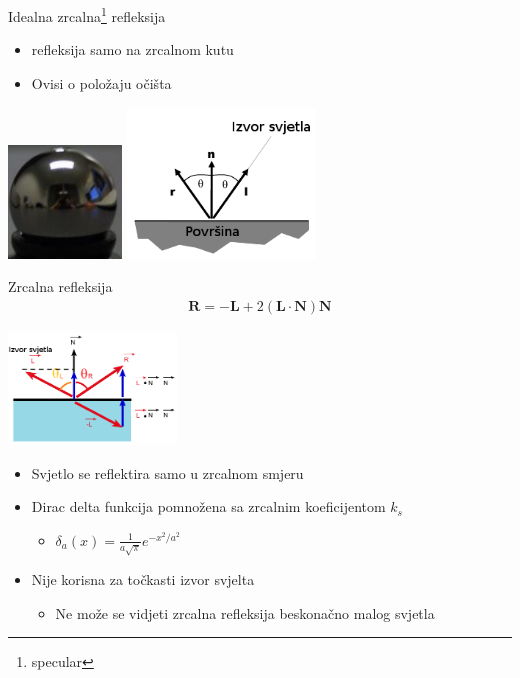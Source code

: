 \documentclass[9pt]{beamer}
\begin{document}
\begin{frame}{Idealna zrcalna\footnote[frame]{specular} refleksija}
	\begin{itemize}
		\item refleksija samo na zrcalnom kutu
		\item Ovisi o položaju očišta	
	\end{itemize}
	\begin{center}
		\includegraphics[height=3cm]{slike/specular_ball.png}
		\includegraphics[height=4cm]{slike/specular_refl.png}
	\end{center}
\end{frame}

\begin{frame}{Zrcalna refleksija}
	\begin{align*}
	\mathbf{R} = -\mathbf{L} + 2 (\mathbf{L}\cdot \mathbf{N})\mathbf{N}
	\end{align*}
	\begin{center}
		\includegraphics[height=3cm]{slike/mirror_refl.png}
	\end{center}
	\begin{itemize} %
		\item Svjetlo se reflektira \alert{samo} u zrcalnom smjeru
		\item Dirac delta funkcija pomnožena sa zrcalnim koeficijentom $k_s$ 
		\begin{itemize}
			\item $\delta_a(x) = \frac{1}{a\sqrt{\pi}}e^{-x^2/a^2}$
		\end{itemize}
		\item Nije korisna za točkasti izvor svjelta
		\begin{itemize}
			\item Ne može se vidjeti zrcalna refleksija beskonačno malog svjetla
		\end{itemize}
	\end{itemize}
\end{frame}
\end{document}
